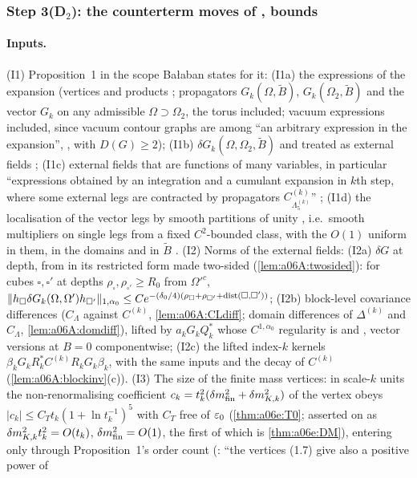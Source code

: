 
\subsubsection*{Step 3(D$_2$): the counterterm moves of \cite[pp.~411--422]{Ba3}, bounds}

\paragraph{Inputs.} (I1) Proposition~1 in the scope Ba{\l}aban states for it: (I1a) the expressions of the expansion \cite[pp.~414--415]{Ba3} (vertices \cite[(1.6)--(1.15)]{Ba3} and products \cite[(1.18)]{Ba3}; propagators $G_k(\Omega,\tilde B)$, $G_k(\Omega_2,\tilde B)$ and the vector $G_k$ on any admissible $\Omega\supset\Omega_2$, the torus included; vacuum expressions included, since vacuum contour graphs are among ``an arbitrary expression in the expansion'', \cite[p.~414]{Ba3}, with $D(G)\ge2$); (I1b) $\delta G_k(\Omega,\Omega_2,\tilde B)$ and \cite[(1.16)]{Ba3} treated as external fields \cite[pp.~414, 419]{Ba3}; (I1c) external fields that are functions of many variables, in particular ``expressions obtained by an integration and a cumulant expansion in $k$th step, where some external legs are contracted by propagators $C^{(k)}_{\Lambda^{(k)}_5}$'' \cite[p.~419]{Ba3}; (I1d) the localisation of the vector legs by smooth partitions of unity \cite[p.~420]{Ba3}, i.e.\ smooth multipliers on single legs from a fixed $C^2$-bounded class, with the $O(1)$ uniform in them, in the domains and in $\tilde B$ \cite[p.~421]{Ba3}. (I2) Norms of the external fields: (I2a) $\delta G$ at depth, from \cite[Thm., (1.10)--(1.12)]{Ba4} in its restricted form made two-sided (\cref{lem:a06A:twosided}): for cubes $\square,\square'$ at depths $\rho_\square,\rho_{\square'}\ge R_0$ from $\Omega'^c$, $\lVert h_\square\delta G_k(\Omega,\Omega')h_{\square'}\rVert_{1,\alpha_0}\le Ce^{-(\delta_0/4)(\rho_\square+\rho_{\square'}+\operatorname{dist}(\square,\square'))}$; (I2b) block-level covariance differences ($C_\Lambda$ against $C^{(k)}$, \cref{lem:a06A:CLdiff}; domain differences of $\Delta^{(k)}$ and $C_\Lambda$, \cref{lem:a06A:domdiff}), lifted by $a_kG_kQ_k^*$ whose $C^{1,\alpha_0}$ regularity is \cite[Thm., (1.9)--(1.10)]{Ba4} and \cite[Prop.~2.2, (2.58)]{Ba2}, vector versions at $B=0$ componentwise; (I2c) the lifted index-$k$ kernels $\beta_kG_kR_k^*C^{(k)}R_kG_k\beta_k$, with the same inputs and the decay of $C^{(k)}$ (\cref{lem:a06A:blockinv}(c)). (I3) The size of the finite mass vertices: in scale-$k$ units the non-renormalising coefficient $c_k=t_k^2(\delta m^2_{\mathrm{fin}}+\delta m^2_{K,k})$ of the \cite[(1.7)]{Ba3} vertex obeys $|c_k|\le C_Tt_k(1+\ln t_k^{-1})^5$ with $C_T$ free of $\varepsilon_0$ (\cref{thm:a06e:T0}; asserted on \cite[p.~418]{Ba3} as $\delta m^2_{K,k}t_k^2=O(t_k)$, $\delta m^2_{\mathrm{fin}}=O(1)$, the first of which is \cref{thm:a06e:DM}), entering only through Proposition~1's order count (\cite[p.~421]{Ba3}: ``the vertices (1.7) give also a positive power of 
